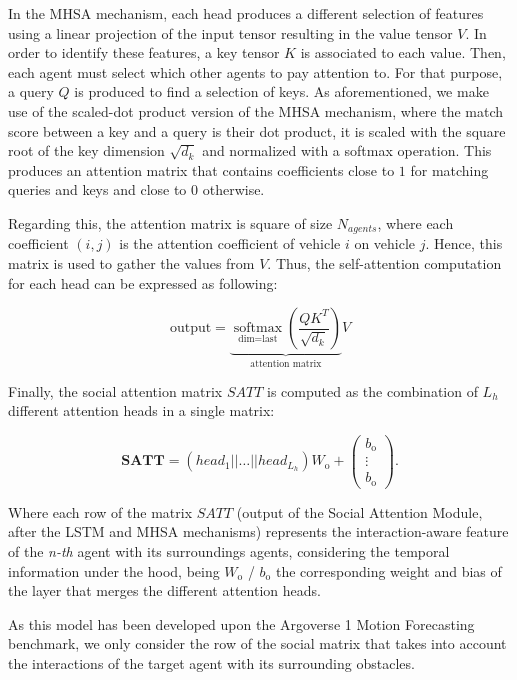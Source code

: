 In the \ac{MHSA} mechanism, each head produces a different selection of features using a linear projection of the input tensor resulting in the value tensor $V$. In order to identify these features, a key tensor $K$ is associated to each value. Then, each agent must select which other agents to pay attention to. For that purpose, a query $Q$ is produced to find a selection of keys. As aforementioned, we make use of the scaled-dot product version of the \ac{MHSA} mechanism, where the match score between a key and a query is their dot product, it is scaled with the square root of the key dimension $\sqrt{d_k}$ and normalized with a softmax operation. This produces an attention matrix that contains coefficients close to $1$ for matching queries and keys and close to $0$ otherwise.

Regarding this, the attention matrix is square of size $N_{agents}$, where each coefficient $(i, j)$ is the attention coefficient of vehicle $i$ on vehicle $j$. Hence, this matrix is used to gather the values from $V$. Thus, the self-attention computation for each head can be expressed as following:

\begin{equation}
	\text{output}=\underbrace{\underset{\text{dim}=\text{last}}{\operatorname{softmax}}\left(\frac{QK^T}{\sqrt{d_k}}\right)}_{\text{attention matrix}}V
	\label{eq:5_self_attention_single_head}
\end{equation}

Finally, the social attention matrix $SATT$ is computed as the combination of $L_h$ different attention heads in a single matrix:

\begin{equation}
	\mathbf{SATT} = (head_1 || \dots || head_{L_h}) W_\mathrm{o} + 
	\begin{pmatrix}
		b_\mathrm{o}\\
		\vdots \\
		b_\mathrm{o}
	\end{pmatrix}.
\end{equation}

Where each row of the matrix $SATT$ (output of the Social Attention Module, after the \ac{LSTM} and \ac{MHSA} mechanisms) represents the interaction-aware feature of the \textit{n-th} agent with its surroundings agents, considering the temporal information under the hood, being $W_\mathrm{o}$ / $b_\mathrm{o}$ the corresponding weight and bias of the layer that merges the different attention heads.

As this model has been developed upon the Argoverse 1 Motion Forecasting benchmark, we only consider the row of the social matrix that takes into account the interactions of the target agent with its surrounding obstacles.

